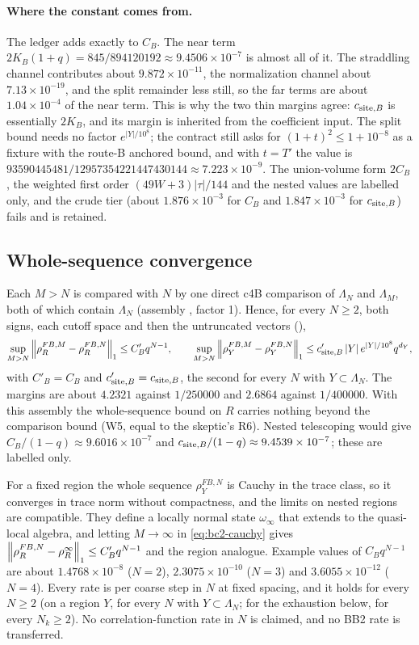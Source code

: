 \paragraph{Where the constant comes from.} The ledger adds exactly to $C_B$.
The near term $2K_B(1+q)=845/894120192\approx9.4506\times10^{-7}$ is almost
all of it. The straddling channel contributes about $9.872\times10^{-11}$,
the normalization channel about $7.13\times10^{-19}$, and the split remainder
less still, so the far terms are about $1.04\times10^{-4}$ of the near term.
This is why the two thin margins agree: $c_{{\rm site},B}$ is essentially
$2K_B$, and its margin is inherited from the coefficient input. The split
bound needs no factor $e^{|Y|/10^8}$; the contract still asks for
$(1+t)^2\le1+10^{-8}$ as a fixture with the route-B anchored bound, and with
$t=T'$ the value is $93590445481/12957354221447430144\approx7.223\times10^{-9}$.
The union-volume form $2C_B$, the weighted first order $(49W+3)|\tau|/144$ and
the nested values are labelled only, and the crude tier (about
$1.876\times10^{-3}$ for $C_B$ and $1.847\times10^{-3}$ for
$c_{{\rm site},B}$) fails and is retained.

\subsection{Whole-sequence convergence}
\label{sec:bc2-whole}
Each $M>N$ is compared with $N$ by one direct c4B comparison of $\Lambda_N$
and $\Lambda_M$, both of which contain $\Lambda_N$ (assembly
, factor 1). Hence, for every $N\ge2$, both signs,
each cutoff space and then the untruncated vectors (),
\begin{equation}
 \sup_{M>N}\left\lVert\rho^{FB,M}_R-\rho^{FB,N}_R\right\rVert_1\le C'_Bq^{N-1},\qquad
 \sup_{M>N}\left\lVert\rho^{FB,M}_Y-\rho^{FB,N}_Y\right\rVert_1\le c'_{{\rm site},B}\,|Y|\,e^{|Y|/10^8}q^{d_Y},
 \label{eq:bc2-cauchy}
\end{equation}
with $C'_B=C_B$ and $c'_{{\rm site},B}=c_{{\rm site},B}$, the second for every
$N$ with $Y\subset\Lambda_N$. The margins are about $4.2321$ against
$1/250000$ and $2.6864$ against $1/400000$. With this assembly the
whole-sequence bound on $R$ carries nothing beyond the comparison bound
(W5, equal to the skeptic's R6). Nested telescoping would give
$C_B/(1-q)\approx9.6016\times10^{-7}$ and
$c_{{\rm site},B}/(1-q)\approx9.4539\times10^{-7}$; these are labelled only.

For a fixed region the whole sequence $\rho^{FB,N}_Y$ is Cauchy in the trace
class, so it converges in trace norm without compactness, and the limits on
nested regions are compatible. They define a locally normal state
$\omega_\infty$ that extends to the quasi-local algebra, and letting
$M\to\infty$ in \eqref{eq:bc2-cauchy} gives
$\left\lVert\rho^{FB,N}_R-\rho^\infty_R\right\rVert_1\le C'_Bq^{N-1}$ and the region analogue.
Example values of $C_Bq^{N-1}$ are about $1.4768\times10^{-8}$ ($N=2$),
$2.3075\times10^{-10}$ ($N=3$) and $3.6055\times10^{-12}$ ($N=4$). Every
rate is per coarse step in $N$ at fixed spacing, and it holds for every
$N\ge2$ (on a region $Y$, for every $N$ with $Y\subset\Lambda_N$; for the
exhaustion below, for every $N_k\ge2$). No correlation-function rate in $N$ is
claimed, and no BB2 rate is transferred.

